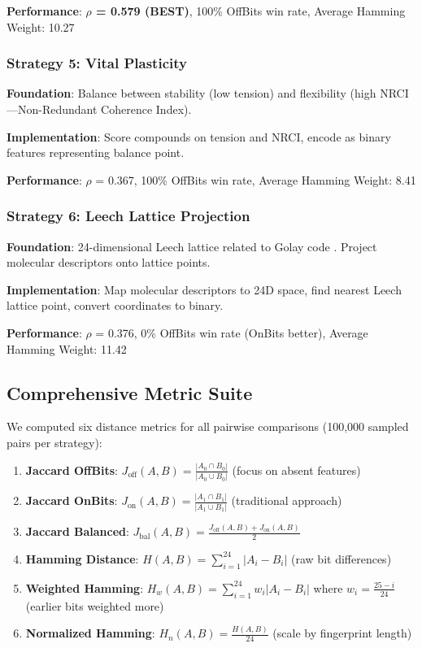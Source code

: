 \documentclass[11pt,letterpaper]{article}
\begin{document}
\textbf{Performance}: \textbf{$\rho$ = 0.579 (BEST)}, 100\% OffBits win rate, Average Hamming Weight: 10.27

\subsubsection{Strategy 5: Vital Plasticity}

\textbf{Foundation}: Balance between stability (low tension) and flexibility (high NRCI—Non-Redundant Coherence Index).

\textbf{Implementation}: Score compounds on tension and NRCI, encode as binary features representing balance point.

\textbf{Performance}: $\rho$ = 0.367, 100\% OffBits win rate, Average Hamming Weight: 8.41

\subsubsection{Strategy 6: Leech Lattice Projection}

\textbf{Foundation}: 24-dimensional Leech lattice related to Golay code \cite{ConwaySloane1999}. Project molecular descriptors onto lattice points.

\textbf{Implementation}: Map molecular descriptors to 24D space, find nearest Leech lattice point, convert coordinates to binary.

\textbf{Performance}: $\rho$ = 0.376, 0\% OffBits win rate (OnBits better), Average Hamming Weight: 11.42

\subsection{Comprehensive Metric Suite}

We computed six distance metrics for all pairwise comparisons (100,000 sampled pairs per strategy):

\begin{enumerate}
    \item \textbf{Jaccard OffBits}: $J_{\text{off}}(A,B) = \frac{|A_0 \cap B_0|}{|A_0 \cup B_0|}$ (focus on absent features)
    \item \textbf{Jaccard OnBits}: $J_{\text{on}}(A,B) = \frac{|A_1 \cap B_1|}{|A_1 \cup B_1|}$ (traditional approach)
    \item \textbf{Jaccard Balanced}: $J_{\text{bal}}(A,B) = \frac{J_{\text{off}}(A,B) + J_{\text{on}}(A,B)}{2}$
    \item \textbf{Hamming Distance}: $H(A,B) = \sum_{i=1}^{24} |A_i - B_i|$ (raw bit differences)
    \item \textbf{Weighted Hamming}: $H_w(A,B) = \sum_{i=1}^{24} w_i |A_i - B_i|$ where $w_i = \frac{25-i}{24}$ (earlier bits weighted more)
    \item \textbf{Normalized Hamming}: $H_n(A,B) = \frac{H(A,B)}{24}$ (scale by fingerprint length)
\end{enumerate}
\end{document}
